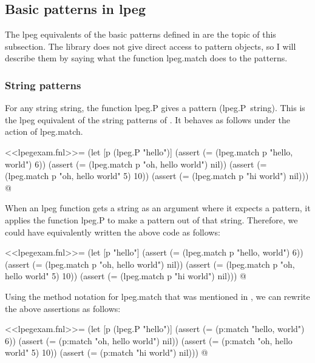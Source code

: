 \documentclass{article}
\begin{document}
\subsection{Basic patterns in lpeg}
\label{sec:7l3dfnco}

The \textsf{lpeg} equivalents of the basic patterns defined in
 are the topic of this subsection.  The library
does not give direct access to pattern objects, so I will describe
them by saying what the function \textsf{lpeg.match} does to the
patterns.

\subsubsection{String patterns}
\label{sec:lk201sc6}

For any string \textsf{string}, the function \textsf{lpeg.P} gives a
pattern \textsf{(lpeg.P~string)}.  This is the \textsf{lpeg}
equivalent of the string patterns of .  It behaves
as follows under the action of \textsf{lpeg.match}.
\begin{codechunk}
<<lpegexam.fnl>>=
(let [p (lpeg.P "hello")]
  (assert (= (lpeg.match p "hello, world") 6))
  (assert (= (lpeg.match p "oh, hello world") nil))
  (assert (= (lpeg.match p "oh, hello world" 5) 10))
  (assert (= (lpeg.match p "hi world") nil)))
@
\end{codechunk}

When an \textsf{lpeg} function gets a string as an argument where it
expects a pattern, it applies the function \textsf{lpeg.P} to make a
pattern out of that string.  Therefore, we could have equivalently
written the above code as follows:
\begin{codechunk}
<<lpegexam.fnl>>=
(let [p "hello"]
  (assert (= (lpeg.match p "hello, world") 6))
  (assert (= (lpeg.match p "oh, hello world") nil))
  (assert (= (lpeg.match p "oh, hello world" 5) 10))
  (assert (= (lpeg.match p "hi world") nil)))
@
\end{codechunk}

Using the method notation for \textsf{lpeg.match} that was mentioned
in , we can rewrite the above assertions as
follows:
\begin{codechunk}
<<lpegexam.fnl>>=
(let [p (lpeg.P "hello")]
  (assert (= (p:match "hello, world") 6))
  (assert (= (p:match "oh, hello world") nil))
  (assert (= (p:match "oh, hello world" 5) 10))
  (assert (= (p:match "hi world") nil)))
@
\end{codechunk}
\end{document}
